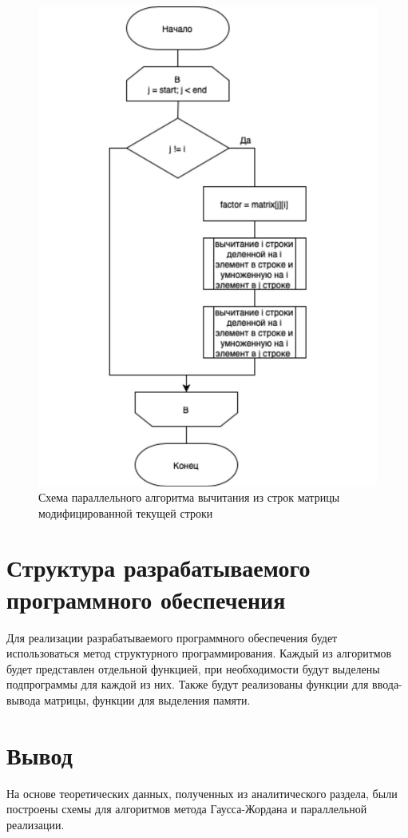 \begin{figure}[h]
    \centering
    \includegraphics[width=0.7\linewidth]{img/paral5.pdf}
    \caption{Схема параллельного алгоритма вычитания из строк матрицы модифицированной текущей строки}
    \label{fig:paral5}
\end{figure}

\clearpage
\section{Структура разрабатываемого программного обеспечения}

Для реализации разрабатываемого программного обеспечения будет использоваться
метод структурного программирования. Каждый из алгоритмов будет представлен
отдельной функцией, при необходимости будут выделены подпрограммы для каждой из
них. Также будут реализованы функции для ввода-вывода матрицы, функции для
выделения памяти.

\section*{Вывод}
На основе теоретических данных, полученных из аналитического раздела, 
были построены схемы для алгоритмов метода Гаусса-Жордана и параллельной реализации.
